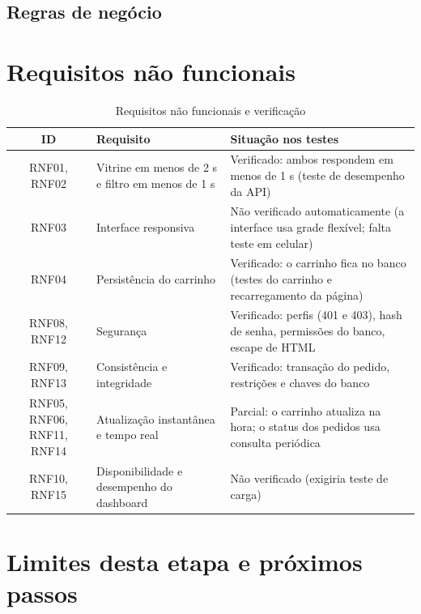 \documentclass[12pt]{article}
\begin{document}
\subsection{Regras de negócio}



\section{Requisitos não funcionais}

\begin{table}[H]
\centering\small\renewcommand{\arraystretch}{1.3}
\begin{tabular}{|c|p{4.6cm}|p{6.2cm}|}
\hline
\rowcolor{gray!30} \textbf{ID} & \textbf{Requisito} & \textbf{Situação nos testes} \\ \hline
RNF01, RNF02 & Vitrine em menos de 2 s e filtro em menos de 1 s & Verificado: ambos respondem em menos de 1 s (teste de desempenho da API) \\ \hline
RNF03 & Interface responsiva & Não verificado automaticamente (a interface usa grade flexível; falta teste em celular) \\ \hline
RNF04 & Persistência do carrinho & Verificado: o carrinho fica no banco (testes do carrinho e recarregamento da página) \\ \hline
RNF08, RNF12 & Segurança & Verificado: perfis (401 e 403), hash de senha, permissões do banco, escape de HTML \\ \hline
RNF09, RNF13 & Consistência e integridade & Verificado: transação do pedido, restrições e chaves do banco \\ \hline
RNF05, RNF06, RNF11, RNF14 & Atualização instantânea e tempo real & Parcial: o carrinho atualiza na hora; o status dos pedidos usa consulta periódica \\ \hline
RNF10, RNF15 & Disponibilidade e desempenho do dashboard & Não verificado (exigiria teste de carga) \\ \hline
\end{tabular}
\caption{Requisitos não funcionais e verificação}
\end{table}

\section{Limites desta etapa e próximos passos}
\label{sec:limites}
\end{document}
